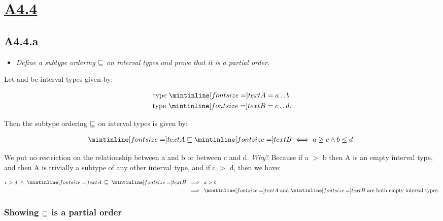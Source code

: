 \newpage
\section{\underline{A4.4}}

\subsection{A4.4.a}

\begin{itemize}
  \item \emph{Define a subtype ordering $\sqsubseteq$ on interval types and
    prove that it is a partial order.}
\end{itemize}


Let  and  be interval types given by:

\begin{align*}
  \text{type } \ms{A} &= a \twodots b\\
  \text{type } \ms{B} &= c \twodots d.
\end{align*}

Then the subtype ordering $\sqsubseteq$ on interval types is given by:

\begin{align}
  \ms A \ltt \ms B \iff a \geq c \land b \leq d\, . \label{subtype_ordering}
\end{align}

We put no restriction on the relationship between \ms a and \ms b or between \ms
c and \ms d. \emph{Why}? Because if \ms a $>$ \ms b then \ms A is an empty
interval type, and then \ms A is trivially a subtype of any other interval type,
and if \ms c $>$ \ms d, then we have:

\begin{align*}
  c > d\ \land\ \ms A\; \ltt\; \ms B \; &\implies \; a > b\\
  &\implies \; \ms A \text{ and } \ms B \text{ are both empty interval
  types.}
\end{align*}

%

\subsubsection{Showing $\sqsubseteq$ is a partial order}

